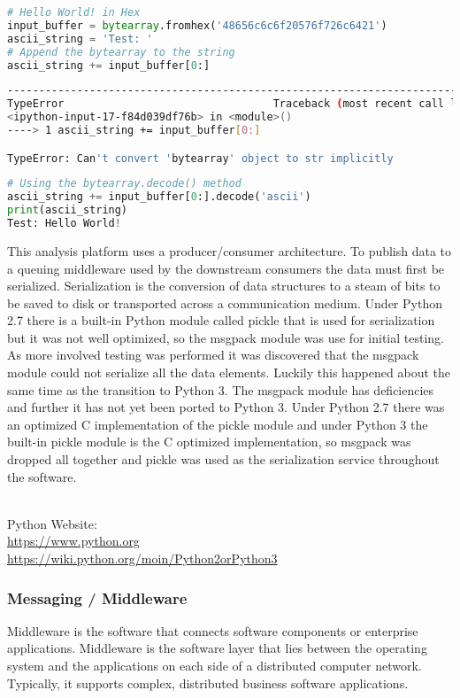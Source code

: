 \lstset{basicstyle=\tiny}
\begin{lstlisting}[language=Python]
# Hello World! in Hex
input_buffer = bytearray.fromhex('48656c6c6f20576f726c6421')
ascii_string = 'Test: '
# Append the bytearray to the string
ascii_string += input_buffer[0:]
\end{lstlisting}
\begin{lstlisting}[language=bash]
---------------------------------------------------------------------------
TypeError                                 Traceback (most recent call last)
<ipython-input-17-f84d039df76b> in <module>()
----> 1 ascii_string += input_buffer[0:]

TypeError: Can't convert 'bytearray' object to str implicitly
\end{lstlisting}
\begin{lstlisting}[language=Python]
# Using the bytearray.decode() method
ascii_string += input_buffer[0:].decode('ascii')
print(ascii_string)
Test: Hello World!
\end{lstlisting}
\lstset{basicstyle=\normalfont}

This analysis platform uses a producer/consumer architecture. To publish data to a queuing middleware used by the downstream consumers the data must first be serialized. Serialization is the conversion of data structures to a steam of bits to be saved to disk or transported across a communication medium. Under Python 2.7 there is a built-in Python module called pickle that is used for serialization but it was not well optimized, so the msgpack module was use for initial testing. As more involved testing was performed it was discovered that the msgpack module could not serialize all the data elements.  Luckily this happened about the same time as the transition to Python 3.  The msgpack module has deficiencies and further it has not yet been ported to Python 3.  Under Python 2.7 there was an optimized C implementation of the pickle module and under Python 3 the built-in pickle module is the C optimized implementation, so msgpack was dropped all together and pickle was used as the serialization service throughout the software.

\noindent
\\Python Website:\\
\url{https://www.python.org}\\
\url{https://wiki.python.org/moin/Python2orPython3}

\subsubsection{Messaging / Middleware}
Middleware is the software that connects software components or enterprise applications. Middleware is the software layer that lies between the operating system and the applications on each side of a distributed computer network. Typically, it supports complex, distributed business software applications.

